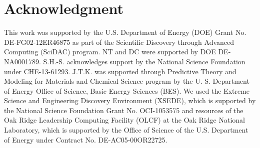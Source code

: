 \documentclass[aip,jcp,numerical,reprint]{revtex4-1}
\begin{document}
\section{Acknowledgment}
 This work was supported by the U.S. Department of Energy (DOE) Grant No. DE-FG02-12ER46875 as part of the Scientific Discovery through Advanced Computing (SciDAC) program. NT and DC were supported by DOE DE-NA0001789. S.H.-S. acknowledges support by the National Science Foundation under CHE-13-61293. J.T.K. was supported through Predictive Theory and Modeling for Materials and Chemical Science program by the U. S. Department of Energy Office of Science, Basic Energy Sciences (BES). We used the Extreme Science and Engineering Discovery Environment (XSEDE), which is supported by the National Science Foundation Grant No. OCI-1053575 and resources of the Oak Ridge Leadership Computing Facility (OLCF) at the Oak Ridge National Laboratory, which is supported by the Office of Science of the U.S. Department of Energy under Contract No. DE-AC05-00OR22725.


\end{document}
